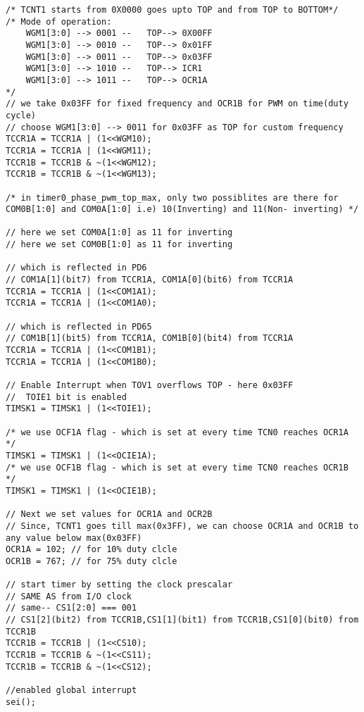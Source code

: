 \documentclass{article}
\begin{document}
\begin{verbatim}
/* TCNT1 starts from 0X0000 goes upto TOP and from TOP to BOTTOM*/
/* Mode of operation:
    WGM1[3:0] --> 0001 --	TOP--> 0X00FF
    WGM1[3:0] --> 0010 --	TOP--> 0x01FF
    WGM1[3:0] --> 0011 --	TOP--> 0x03FF
    WGM1[3:0] --> 1010 --	TOP--> ICR1
    WGM1[3:0] --> 1011 --	TOP--> OCR1A
*/	
// we take 0x03FF for fixed frequency and OCR1B for PWM on time(duty cycle)	
// choose WGM1[3:0] --> 0011 for 0x03FF as TOP for custom frequency
TCCR1A = TCCR1A | (1<<WGM10);
TCCR1A = TCCR1A | (1<<WGM11);
TCCR1B = TCCR1B & ~(1<<WGM12);
TCCR1B = TCCR1B & ~(1<<WGM13);

/* in timer0_phase_pwm_top_max, only two possiblites are there for COM0B[1:0] and COM0A[1:0] i.e) 10(Inverting) and 11(Non- inverting) */

// here we set COM0A[1:0] as 11 for inverting
// here we set COM0B[1:0] as 11 for inverting

// which is reflected in PD6
// COM1A[1](bit7) from TCCR1A, COM1A[0](bit6) from TCCR1A
TCCR1A = TCCR1A | (1<<COM1A1);
TCCR1A = TCCR1A | (1<<COM1A0);

// which is reflected in PD65
// COM1B[1](bit5) from TCCR1A, COM1B[0](bit4) from TCCR1A	
TCCR1A = TCCR1A | (1<<COM1B1);
TCCR1A = TCCR1A | (1<<COM1B0);

// Enable Interrupt when TOV1 overflows TOP - here 0x03FF
//  TOIE1 bit is enabled
TIMSK1 = TIMSK1 | (1<<TOIE1);

/* we use OCF1A flag - which is set at every time TCN0 reaches OCR1A */
TIMSK1 = TIMSK1 | (1<<OCIE1A);
/* we use OCF1B flag - which is set at every time TCN0 reaches OCR1B */
TIMSK1 = TIMSK1 | (1<<OCIE1B);

// Next we set values for OCR1A and OCR2B
// Since, TCNT1 goes till max(0x3FF), we can choose OCR1A and OCR1B to any value below max(0x03FF)
OCR1A = 102; // for 10% duty clcle
OCR1B = 767; // for 75% duty clcle

// start timer by setting the clock prescalar
// SAME AS from I/O clock
// same-- CS1[2:0] === 001
// CS1[2](bit2) from TCCR1B,CS1[1](bit1) from TCCR1B,CS1[0](bit0) from TCCR1B
TCCR1B = TCCR1B | (1<<CS10);
TCCR1B = TCCR1B & ~(1<<CS11);
TCCR1B = TCCR1B & ~(1<<CS12);

//enabled global interrupt
sei();
\end{verbatim}
\end{document}
